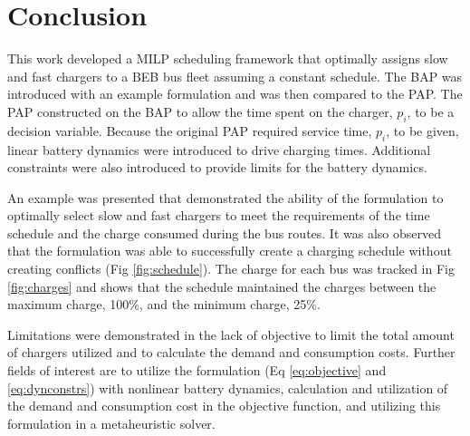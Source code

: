 \documentclass[letterpaper, 10pt, conference]{IEEEtran}
\begin{document}
\section{Conclusion}
\label{sec:conclusion}
This work developed a MILP scheduling framework that optimally assigns slow and fast chargers to a BEB bus fleet
assuming a constant schedule. The BAP was introduced with an example formulation and was then compared to the PAP. The
PAP constructed on the BAP to allow the time spent on the charger, $p_i$, to be a decision variable. Because the
original PAP required service time, $p_i$, to be given, linear battery dynamics were introduced to drive charging times.
Additional constraints were also introduced to provide limits for the battery dynamics. 

An example was presented that demonstrated the ability of the formulation to optimally select slow and fast chargers to meet the requirements of the time schedule and the charge consumed during the bus routes. It was also observed that the formulation was able to successfully create a charging schedule without creating conflicts (Fig \ref{fig:schedule}). The charge for each bus was tracked in Fig \ref{fig:charges} and shows that the schedule maintained the charges between the maximum charge, 100\%, and the minimum charge, 25\%.

Limitations were demonstrated in the lack of objective to limit the total amount of chargers utilized and to calculate the demand and consumption costs. Further fields of interest are to utilize the formulation (Eq \eqref{eq:objective} and \eqref{eq:dynconstrs}) with nonlinear battery dynamics, calculation and utilization of the demand and consumption cost in the objective function, and utilizing this formulation in a metaheuristic solver.




\end{document}
